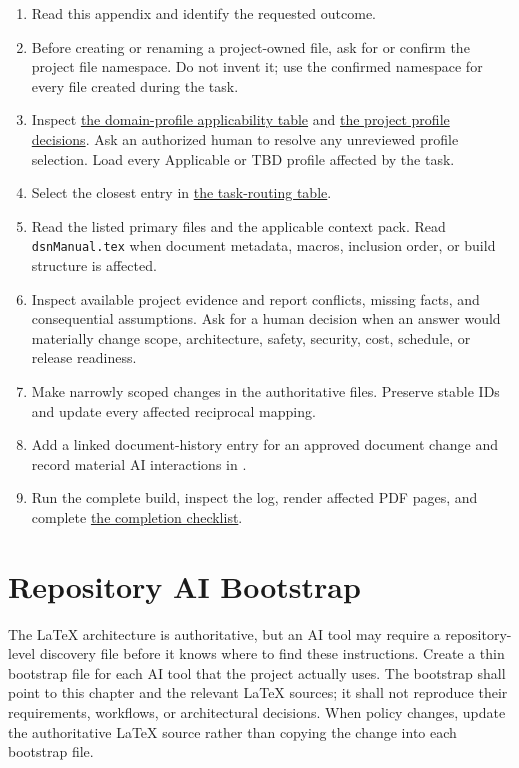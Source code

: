 \begin{enumerate}
\item Read this appendix and identify the requested outcome.
\item Before creating or renaming a project-owned file, ask for or confirm the
project file namespace. Do not invent it; use the confirmed namespace for every
file created during the task.
\item Inspect \hyperref[Table:DomainProfileApplicability]{the domain-profile
applicability table} and \hyperref[Table:ProjectDomainProfiles]{the project
profile decisions}. Ask an authorized human to resolve any unreviewed profile
selection. Load every Applicable or TBD profile affected by the task.
\item Select the closest entry in
\hyperref[Table:AITaskRouting]{the task-routing table}.
\item Read the listed primary files and the applicable context pack. Read
\texttt{dsnManual.tex} when document metadata, macros, inclusion order, or
build structure is affected.
\item Inspect available project evidence and report conflicts, missing facts,
and consequential assumptions. Ask for a human decision when an answer would
materially change scope, architecture, safety, security, cost, schedule, or
release readiness.
\item Make narrowly scoped changes in the authoritative files. Preserve stable
IDs and update every affected reciprocal mapping.
\item Add a linked document-history entry for an approved document change and
record material AI interactions in .
\item Run the complete build, inspect the log, render affected PDF pages, and
complete \hyperref[Table:AICompletionChecklist]{the completion checklist}.
\end{enumerate}

\section{Repository AI Bootstrap}
\label{Section:AIRepositoryBootstrap}

The LaTeX architecture is authoritative, but an AI tool may require a
repository-level discovery file before it knows where to find these
instructions. Create a thin bootstrap file for each AI tool that the project
actually uses. The bootstrap shall point to this chapter and the relevant
LaTeX sources; it shall not reproduce their requirements, workflows, or
architectural decisions. When policy changes, update the authoritative LaTeX
source rather than copying the change into each bootstrap file.

